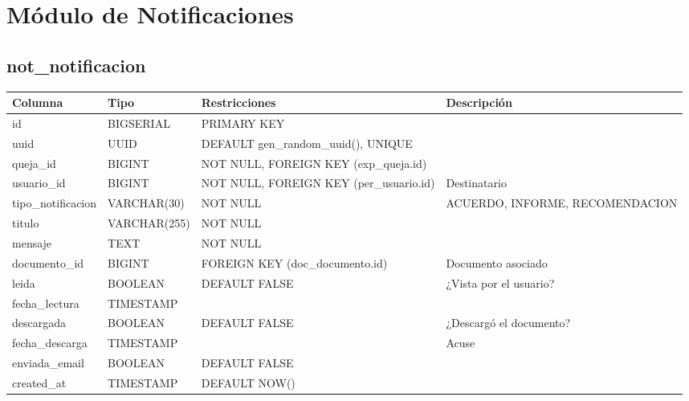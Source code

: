 \documentclass[12pt, a4paper]{article}
\begin{document}
\section{Módulo de Notificaciones}
\label{sec:notificaciones}

\subsection{not\_notificacion}
\begin{longtable}{|p{3.5cm}|p{2.5cm}|p{3cm}|p{5cm}|}
    \hline
    \rowcolor[gray]{0.9}
    \textbf{Columna} & \textbf{Tipo} & \textbf{Restricciones} & \textbf{Descripción} \\
    \hline
    id & BIGSERIAL & PRIMARY KEY & \\
    \hline
    uuid & UUID & DEFAULT gen\_random\_uuid(), UNIQUE & \\
    \hline
    queja\_id & BIGINT & NOT NULL, FOREIGN KEY (exp\_queja.id) & \\
    \hline
    usuario\_id & BIGINT & NOT NULL, FOREIGN KEY (per\_usuario.id) & Destinatario \\
    \hline
    tipo\_notificacion & VARCHAR(30) & NOT NULL & ACUERDO, INFORME, RECOMENDACION \\
    \hline
    titulo & VARCHAR(255) & NOT NULL & \\
    \hline
    mensaje & TEXT & NOT NULL & \\
    \hline
    documento\_id & BIGINT & FOREIGN KEY (doc\_documento.id) & Documento asociado \\
    \hline
    leida & BOOLEAN & DEFAULT FALSE & ¿Vista por el usuario? \\
    \hline
    fecha\_lectura & TIMESTAMP & & \\
    \hline
    descargada & BOOLEAN & DEFAULT FALSE & ¿Descargó el documento? \\
    \hline
    fecha\_descarga & TIMESTAMP & & Acuse \\
    \hline
    enviada\_email & BOOLEAN & DEFAULT FALSE & \\
    \hline
    created\_at & TIMESTAMP & DEFAULT NOW() & \\
    \hline
\end{longtable}

\end{document}

